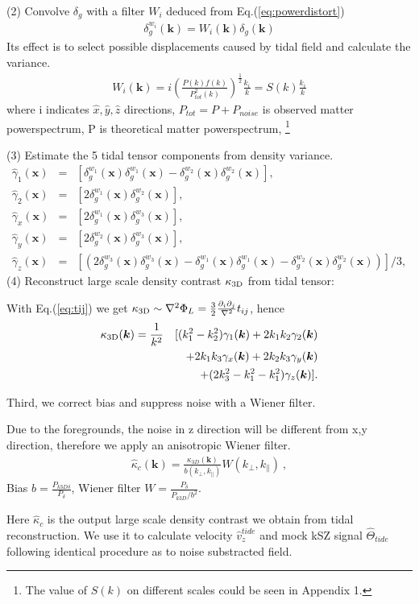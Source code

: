 (2) Convolve $\delta_g$ with a filter $W_i$ 
deduced from Eq.(\ref{eq:powerdistort}) 
\begin{eqnarray}
\delta^{w_i}_g(\bm{k})=W_i(\bm{k})\delta_g(\bm{k}) 
\end{eqnarray}
Its effect is to select possible displacements caused by tidal field and calculate the variance.
\begin{eqnarray}
\label{eq:wi}
W_i(\bm{k})=i (\frac{P(k)f(k)}{P_{tot}^2(k)})^{\frac{1}{2}}\frac{k_i}{k}
=S(k)\frac{k_i}{k}\nonumber
\end{eqnarray}
where i indicates $\hat x,\hat y,\hat z$ directions, 
$P_{tot}=P+P_{noise}$ is observed matter powerspectrum, 
P is theoretical matter powerspectrum,
\footnote{The value of $S(k)$ on different scales could be seen in Appendix 1.}

(3) Estimate the 5 tidal tensor components from density variance.
\begin{eqnarray}
\label{eq:gamma}
\hat{\gamma}_1(\bm{x})&=&
[{\delta}^{w_1}_g(\bm{x}){\delta}^{w_1}_g(\bm{x})-
{\delta}^{w_2}_g(\bm{x}){\delta}^{w_2}_g(\bm{x})],\nonumber\\
\hat{\gamma}_2(\bm{x})&=&
[2{\delta}^{w_1}_g(\bm{x}){\delta}^{w_2}_g(\bm{x})],\nonumber\\
\hat{\gamma}_x(\bm{x})&=&
[2{\delta}^{w_1}_g(\bm{x}){\delta}^{w_3}_g(\bm{x})],\\
\hat{\gamma}_y(\bm{x})&=&
[2{\delta}^{w_2}_g(\bm{x}){\delta}^{w_3}_g(\bm{x})],\nonumber\\
\hat{\gamma}_z(\bm{x})&=&
[(2{\delta}^{w_3}_g(\bm{x}){\delta}^{w_3}_g(\bm{x})-
{\delta}^{w_1}_g(\bm{x}){\delta}^{w_1}_g(\bm{x})-
{\delta}^{w_2}_g(\bm{x}){\delta}^{w_2}_g(\bm{x}))]/3,\nonumber
\end{eqnarray}
(4) Reconstruct large scale density contrast $\kappa_\mathrm{3D}$ from tidal tensor:


With Eq.(\ref{eq:tij}) we get 
$\kappa_\mathrm{3D}\sim\nabla^2\Phi_L=\frac{3}{2}\frac{\partial_i\partial_j}{\nabla^2}t_{ij}$, hence
\begin{eqnarray}
\kappa_\mathrm{3D}(\bm{k})=\frac{1}{k^2}
&&[(k_1^2-k_2^2)\gamma_1(\bm{k})+2k_1k_2\gamma_2(\bm{k})\nonumber\\
&&+2k_1k_3\gamma_x(\bm{k})+2k_2k_3\gamma_y(\bm{k})\\\nonumber
&&+(2k_3^2-k_1^2-k_1^2)\gamma_z(\bm{k})].
\end{eqnarray}

Third, we correct bias and suppress noise with a Wiener filter.

Due to the foregrounds, the noise in z direction will be different from x,y direction, therefore we apply an anisotropic Wiener filter.
\begin{eqnarray}
	\label{eq:wiener}
\hat \kappa_{c}(\bm{k})=\frac{\kappa_{3D}(\bm{k})}{b(k_\perp,k_\parallel)}W(k_\perp,k_\parallel)\ ,
\end{eqnarray}
Bias $b=\frac{P_{k3D \delta}}{P_\delta}$, Wiener filter $W=\frac{P_\delta}{P_{k3D}/b^2}$.

Here $\hat \kappa_{c}$ is the output large scale density contrast we obtain from tidal reconstruction.
We use it to calculate velocity $\hat v_z^{tide}$ and mock kSZ signal $\hat \Theta_{tide}$ following identical procedure as to noise substracted field.

